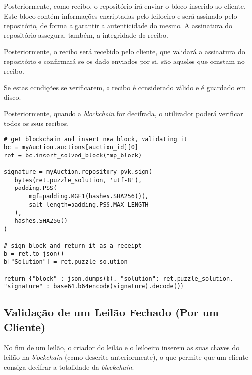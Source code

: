 \documentclass[12pt]{article}
\begin{document}
\par Posteriormente, como recibo, o repositório irá enviar o bloco inserido ao cliente. Este bloco contém informações encriptadas pelo leiloeiro e será assinado pelo repositório, de forma a garantir a autenticidade do mesmo. A assinatura do repositório assegura, também, a integridade do recibo.

\par Posteriormente, o recibo será recebido pelo cliente, que validará a assinatura do repositório e confirmará se os dado enviados por si, são aqueles que constam no recibo.

\par Se estas condições se verificarem, o recibo é considerado válido e é guardado em disco.

\par Posteriormente, quando a \textit{blockchain} for decifrada, o utilizador poderá verificar todos os seus recibos.

\vspace{5mm} %

\begin{lstlisting}[caption={Inserção de um Bloco na  \textit{Blockchain} e Posterior Envio do Recibo do Mesmo },captionpos=b]
# get blockchain and insert new block, validating it
bc = myAuction.auctions[auction_id][0]
ret = bc.insert_solved_block(tmp_block)

signature = myAuction.repository_pvk.sign(
   bytes(ret.puzzle_solution, 'utf-8'),
   padding.PSS(
       mgf=padding.MGF1(hashes.SHA256()),
       salt_length=padding.PSS.MAX_LENGTH
   ),
   hashes.SHA256()
)

# sign block and return it as a receipt
b = ret.to_json()
b["Solution"] = ret.puzzle_solution

return {"block" : json.dumps(b), "solution": ret.puzzle_solution, "signature" : base64.b64encode(signature).decode()}
\end{lstlisting}




\subsection{Validação de um Leilão Fechado (Por um Cliente)}

\par No fim de um leilão, o criador do leilão e o leiloeiro inserem as suas chaves do leilão na \textit{blockchain} (como descrito anteriormente), o que permite que um cliente consiga decifrar a totalidade da \textit{blockchain}.
\end{document}
